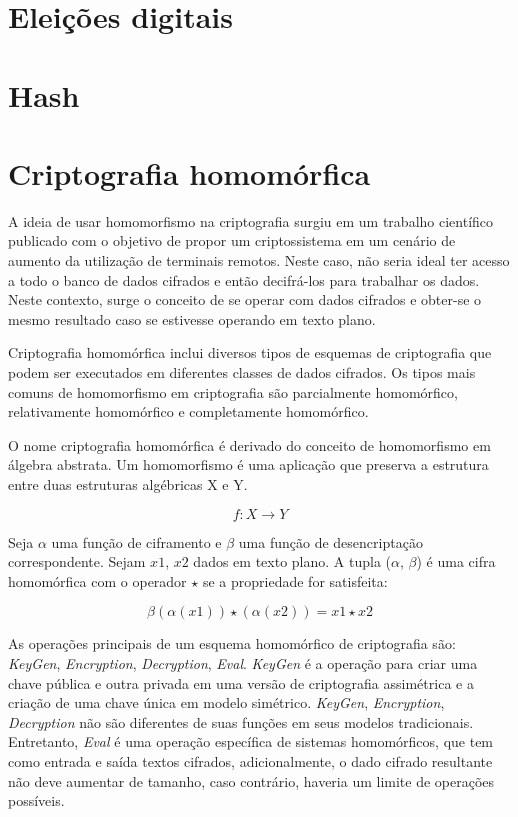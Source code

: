 \documentclass{ufsctex/ufsctex}
\begin{document}
\section{Eleições digitais}

\section{Hash}

\section{Criptografia homomórfica}

A ideia de usar homomorfismo na criptografia surgiu em um trabalho científico
publicado com o objetivo de propor um criptossistema em um cenário de aumento da
utilização de terminais remotos. Neste caso, não seria ideal ter acesso a todo o
banco de dados cifrados e então decifrá-los para trabalhar os dados. Neste
contexto, surge o conceito de se operar com dados cifrados e obter-se o mesmo
resultado caso se estivesse operando em texto plano.\cite{homomorphic}

Criptografia homomórfica inclui diversos tipos de esquemas de criptografia que
podem ser executados em diferentes classes de dados cifrados. Os tipos mais
comuns de homomorfismo em criptografia são parcialmente homomórfico,
relativamente homomórfico e completamente homomórfico.\cite{survey-homo}

O nome criptografia homomórfica é derivado do conceito de homomorfismo em
álgebra abstrata. Um homomorfismo é uma aplicação que preserva a estrutura entre
duas estruturas algébricas X e Y.

\begin{equation}
{f} : X \longrightarrow Y
\end{equation}

Seja $\alpha$ uma função de ciframento e $\beta$ uma função de desencriptação
correspondente. Sejam $x1$, $x2$ dados em texto plano. A tupla ($\alpha$,
$\beta$) é uma cifra homomórfica com o operador $\star$ se a propriedade for
satisfeita:

\begin{equation}
\beta (\alpha(x1)) \star (\alpha(x2)) = x1 \star x2
\end{equation}

As operações principais de um esquema homomórfico de criptografia são:
\textit{KeyGen}, \textit{Encryption}, \textit{Decryption}, \textit{Eval}.
\textit{KeyGen} é a operação para criar uma chave pública e outra privada em uma
versão de criptografia assimétrica e a criação de uma chave única em modelo
simétrico. \textit{KeyGen}, \textit{Encryption}, \textit{Decryption} não são
diferentes de suas funções em seus modelos tradicionais.  Entretanto,
\textit{Eval} é uma operação específica de sistemas homomórficos, que tem como
entrada e saída textos cifrados, adicionalmente, o dado cifrado resultante não
deve aumentar de tamanho, caso contrário, haveria um limite de operações
possíveis.\cite{survey-homo}
\end{document}
